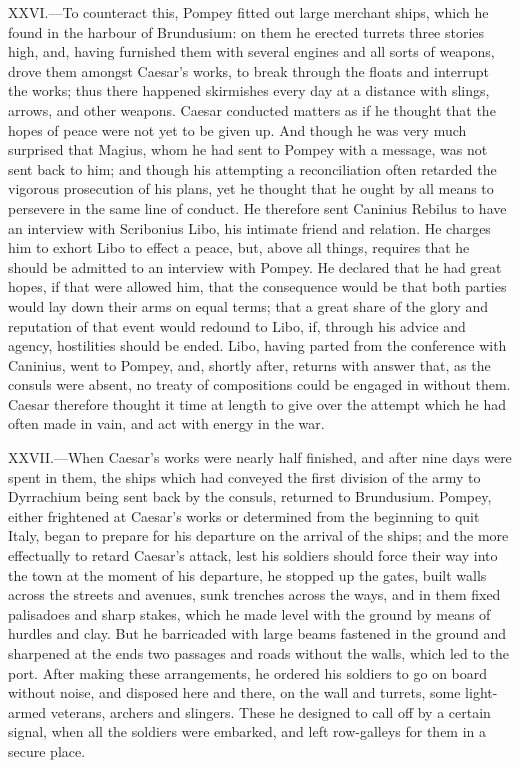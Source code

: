 XXVI.—To counteract this, Pompey fitted out large merchant ships, which
he found in the harbour of Brundusium: on them he erected turrets three
stories high, and, having furnished them with several engines and all
sorts of weapons, drove them amongst Caesar's works, to break through
the floats and interrupt the works; thus there happened skirmishes every
day at a distance with slings, arrows, and other weapons. Caesar
conducted matters as if he thought that the hopes of peace were not yet
to be given up. And though he was very much surprised that Magius, whom
he had sent to Pompey with a message, was not sent back to him; and
though his attempting a reconciliation often retarded the vigorous
prosecution of his plans, yet he thought that he ought by all means to
persevere in the same line of conduct. He therefore sent Caninius
Rebilus to have an interview with Scribonius Libo, his intimate friend
and relation. He charges him to exhort Libo to effect a peace, but,
above all things, requires that he should be admitted to an interview
with Pompey. He declared that he had great hopes, if that were allowed
him, that the consequence would be that both parties would lay down
their arms on equal terms; that a great share of the glory and
reputation of that event would redound to Libo, if, through his advice
and agency, hostilities should be ended. Libo, having parted from the
conference with Caninius, went to Pompey, and, shortly after, returns
with answer that, as the consuls were absent, no treaty of compositions
could be engaged in without them. Caesar therefore thought it time at
length to give over the attempt which he had often made in vain, and act
with energy in the war.

XXVII.—When Caesar's works were nearly half finished, and after nine
days were spent in them, the ships which had conveyed the first division
of the army to Dyrrachium being sent back by the consuls, returned to
Brundusium. Pompey, either frightened at Caesar's works or determined
from the beginning to quit Italy, began to prepare for his departure on
the arrival of the ships; and the more effectually to retard Caesar's
attack, lest his soldiers should force their way into the town at the
moment of his departure, he stopped up the gates, built walls across the
streets and avenues, sunk trenches across the ways, and in them fixed
palisadoes and sharp stakes, which he made level with the ground by
means of hurdles and clay. But he barricaded with large beams fastened
in the ground and sharpened at the ends two passages and roads without
the walls, which led to the port. After making these arrangements, he
ordered his soldiers to go on board without noise, and disposed here and
there, on the wall and turrets, some light-armed veterans, archers and
slingers. These he designed to call off by a certain signal, when all
the soldiers were embarked, and left row-galleys for them in a secure
place.

